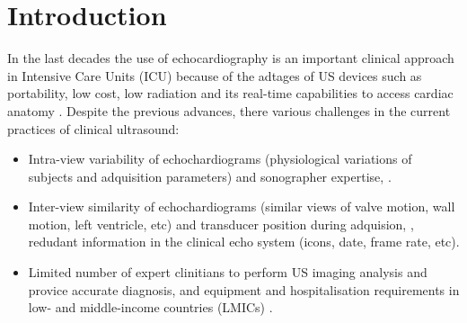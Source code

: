 \section{Introduction} \label{sec:intro}
In the last decades the use of echocardiography is an important clinical approach in Intensive Care Units (ICU) because of the adtages of US devices such as portability, low cost, low radiation and its real-time capabilities to access cardiac anatomy \cite{Feigenbaum1996, Vieillard-Baron2008, singh2007, cambell2018}.
Despite the previous advances, there various challenges in the current practices of clinical ultrasound: 

\begin{itemize}
\setlength\itemsep{0em}

\item Intra-view variability of echochardiograms (physiological variations of subjects and adquisition parameters) and sonographer expertise,
 \cite{khamis2017, Feigenbaum1996, field2011}.

\item Inter-view similarity of echochardiograms (similar views of valve motion, wall motion, left ventricle, etc) and transducer position during adquision,
\cite{zhang2018},
redudant information in the clinical echo system (icons, date, frame rate, etc).
\cite{khamis2017}

\item Limited number of expert clinitians to perform US imaging analysis and provice accurate diagnosis, and equipment and hospitalisation requirements in low- and middle-income countries (LMICs)
\cite{hao2021-wellcome}.

\end{itemize}


